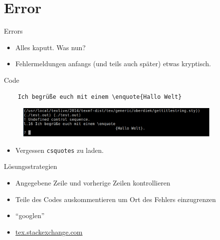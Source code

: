\section{Error}
\begin{frame}[fragile]{Errors}
  \begin{itemize}
    \item Alles kaputt. Was nun?
    \item Fehlermeldungen anfangs (und teils auch später) etwas kryptisch.
  \end{itemize}
  \begin{block}{Code}
    \begin{lstlisting}
    Ich begrüße euch mit einem \enquote{Hallo Welt}
    \end{lstlisting}
  \end{block}
  \begin{figure}
  \centering
  \includegraphics[width=0.9\textwidth]{figures/error1.png}
  \end{figure}
  \huge
  \begin{itemize}
    \item<2->[$\Rightarrow$] Vergessen \texttt{csquotes} zu laden.
  \end{itemize}
\end{frame}

\begin{frame}{Lösungsstrategien}
  \Large
  \begin{itemize}
    \item Angegebene Zeile und vorherige Zeilen kontrollieren
    \item Teile des Codes auskommentieren um Ort des Fehlers einzugrenzen
    \item \enquote{googlen}
    \item \href{tex.stackexchange.com}{tex.stackexchange.com}
  \end{itemize}
\end{frame}
